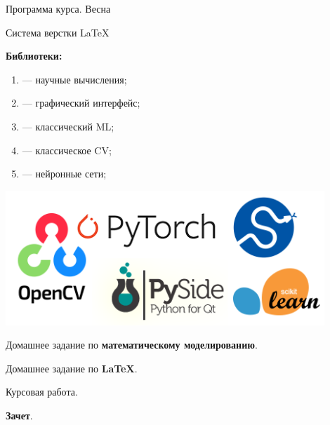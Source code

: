 \documentclass[russian, unicode, xcolor={dvipsnames}, aspectratio=43]{beamer}
\begin{document}
\begin{frame}{Программа курса. Весна}
	
	\begin{minipage}{0.49\textwidth}
		Система верстки \LaTeX
		
		\textbf{Библиотеки:}
		\begin{enumerate}
			\item {} --- научные вычисления;
			\item {} --- графический интерфейс;
			\item {} --- классический ML;
			\item {} --- классическое CV;
			\item {} --- нейронные сети; 
		\end{enumerate}
	\end{minipage}
	\begin{minipage}{0.49\textwidth}
		\includegraphics[width=0.9\textwidth]{pictures/spring_logos.png}
		
		\begin{tcolorbox}[colback=green!5,colframe=green!75!black,title=Аттестация]
			Домашнее задание по \textbf{математическому моделированию}.
			
			Домашнее задание по \textbf{\LaTeX}.
			
			Курсовая работа.
			
			\textbf{Зачет}.	
		\end{tcolorbox}
		
	\end{minipage}

\end{frame}
\end{document}
